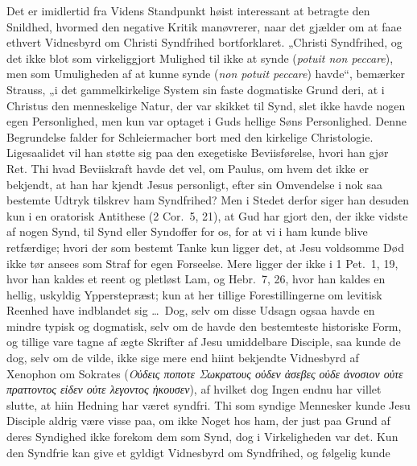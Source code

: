 \documentclass[12pt]{book}
\begin{document}
Det er imidlertid fra Videns Standpunkt høist interessant at
betragte den Snildhed, hvormed den negative Kritik manøvrerer, naar
det gjælder om at faae ethvert Vidnesbyrd om Christi Syndfrihed
bortforklaret. „Christi Syndfrihed, og det ikke blot som
virkeliggjort Mulighed til ikke at synde (\textit{potuit non
peccare}), men som Umuligheden af at kunne synde (\textit{non potuit
peccare}) havde“, bemærker Strauss, „i det gammelkirkelige System
sin faste dogmatiske Grund deri, at i Christus den menneskelige
Natur, der var skikket til Synd, slet ikke havde nogen egen
Personlighed, men kun var optaget i Guds hellige Søns Personlighed.
Denne Begrundelse falder for Schleiermacher bort med den kirkelige
Christologie.
Ligesaalidet vil han støtte sig paa den exegetiske Beviisførelse,
hvori han gjør Ret. Thi hvad Beviiskraft havde det vel, om Paulus,
om hvem det ikke er bekjendt, at han har kjendt Jesus personligt,
efter sin Omvendelse i nok saa bestemte Udtryk tilskrev ham
Syndfrihed? Men i Stedet derfor siger han desuden kun i en oratorisk
Antithese (2 Cor.\ 5, 21), at Gud har gjort den, der ikke vidste af
nogen Synd, til Synd eller Syndoffer for os, for at vi i ham kunde
blive retfærdige; hvori der som bestemt Tanke kun ligger det, at
Jesu voldsomme Død ikke tør ansees som Straf for egen Forseelse.
Mere ligger der ikke i 1 Pet.\ 1, 19, hvor han kaldes et reent og
pletløst Lam, og Hebr.\ 7, 26, hvor han kaldes en hellig, uskyldig
Ypperstepræst; kun at her tillige Forestillingerne om levitisk
Reenhed have indblandet sig \dots\ Dog, selv om disse Udsagn ogsaa
havde en mindre typisk og dogmatisk, selv om de havde den
bestemteste historiske Form, og tillige vare tagne af ægte Skrifter
af Jesu umiddelbare Disciple, saa kunde de dog, selv om de vilde,
ikke sige mere end hiint bekjendte Vidnesbyrd af Xenophon om
Sokrates (\textit{Οὐδεις ποποτε Σωκρατους οὐδεν ἀσεβες οὐδε ἀνοσιον
οὐτε πραττοντος εἰδεν οὐτε λεγοντος ἠκουσεν}), af hvilket dog Ingen
endnu har villet slutte, at hiin Hedning har været syndfri.
Thi som syndige Mennesker kunde Jesu Disciple aldrig være visse paa,
om ikke Noget hos ham, der just paa Grund af deres Syndighed ikke
forekom dem som Synd, dog i Virkeligheden var det. Kun den Syndfrie
kan give et gyldigt Vidnesbyrd om Syndfrihed, og følgelig kunde
\end{document}
